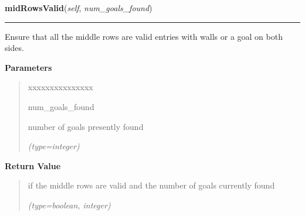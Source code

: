 \hspace{.8\funcindent}\begin{boxedminipage}{\funcwidth}

    \raggedright \textbf{midRowsValid}(\textit{self}, \textit{num\_goals\_found})

    \vspace{-1.5ex}

    \rule{\textwidth}{0.5\fboxrule}
\setlength{\parskip}{2ex}
    Ensure that all the middle rows are valid entries with walls or a goal 
    on both sides.

\setlength{\parskip}{1ex}
      \textbf{Parameters}
      \vspace{-1ex}

      \begin{quote}
        \begin{Ventry}{xxxxxxxxxxxxxxx}

          \item[num\_goals\_found]

          number of goals presently found

            {\it (type=integer)}

        \end{Ventry}

      \end{quote}

      \textbf{Return Value}
    \vspace{-1ex}

      \begin{quote}
      if the middle rows are valid and the number of goals currently found

      {\it (type=boolean, integer)}

      \end{quote}

    \end{boxedminipage}

    \label{UnBlockMe:Map:Map:Map:playerFound}

    \vspace{0.5ex}

